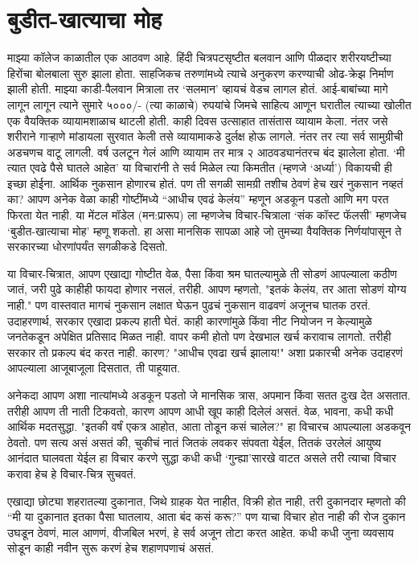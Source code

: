 \chapter{बुडीत-खात्याचा मोह}

माझ्या कॉलेज काळातील एक आठवण आहे. हिंदी चित्रपटसृष्टीत बलवान आणि पीळदार शरीरयष्टीच्या हिरोंचा बोलबाला सुरु झाला होता. साहजिकच तरुणांमध्ये त्याचे अनुकरण करण्याची ओढ-क्रेझ निर्माण झाली होती. माझ्या काडी-पैलवान मित्राला तर ‘सलमान’ व्हायचं वेडच लागल होतं. आई-बाबांच्या मागे लागून लागून त्याने सुमारे ५०००/- (त्या काळाचे) रुपयांचे जिमचे साहित्य आणून घरातील त्याच्या खोलीत एक वैयक्तिक व्यायामशाळाच थाटली होती. काही दिवस उत्साहात तासंतास व्यायाम केला. नंतर जसे शरीराने गाऱ्हाणे  मांडायला सुरवात केली तसे व्यायामाकडे दुर्लक्ष होऊ लागले. नंतर तर त्या सर्व सामुग्रीची अडचणच वाटू लागली. वर्ष उलटून गेलं आणि व्यायाम तर मात्र २ आठवड्यानंतरच बंद झालेला होता. ‘मी त्यात एवढे पैसे घातले आहेत’ या विचारांनी ते सर्व मिळेल त्या किमतीत (म्हणजे ‘अर्ध्या’) विकायची ही इच्छा होईना. आर्थिक नुकसान होणारच होतं. पण ती सगळी सामग्री तशीच ठेवणं हेच खरं नुकसान नव्हतं का? आपण अनेक वेळा काही गोष्टींमध्ये “आधीच एवढं केलंय” म्हणून अडकून पडतो आणि मग परत फिरता येत नाही. या मेंटल मॉडेल (मन:प्रारूप) ला म्हणजेच विचार-चित्राला ‘संक कॉस्ट फॅलसी’ म्हणजेच ‘बुडीत-खात्याचा मोह’ म्हणू शकतो. हा असा मानसिक सापळा आहे जो तुमच्या वैयक्तिक निर्णयांपासून ते सरकारच्या धोरणांपर्यंत सगळीकडे दिसतो.

या विचार-चित्रात, आपण एखाद्या गोष्टीत वेळ, पैसा किंवा श्रम घातल्यामुळे ती सोडणं आपल्याला कठीण जातं, जरी पुढे काहीही फायदा होणार नसलं, तरीही. आपण म्हणतो, "इतकं केलंय, तर आता सोडणं योग्य नाही." पण वास्तवात मागचं नुकसान लक्षात घेऊन पुढचं नुकसान वाढवणं अजूनच घातक ठरतं. उदाहरणार्थ, सरकार एखादा प्रकल्प हाती घेतं. काही कारणांमुळे किंवा नीट नियोजन न केल्यामुळे जनतेकडून अपेक्षित प्रतिसाद मिळत नाही. वापर कमी होतो पण देखभाल खर्च करावाच लागतो. तरीही सरकार तो प्रकल्प बंद करत नाही. कारण? "आधीच एवढा खर्च झालाय!" अशा प्रकारची अनेक उदाहरणं आपल्याला आजूबाजूला दिसतात, ती पाहूयात.

अनेकदा आपण अशा नात्यांमध्ये अडकून पडतो जे मानसिक त्रास, अपमान किंवा सतत दुःख देत असतात. तरीही आपण ती नाती टिकवतो, कारण आपण आधी खूप काही दिलेलं असतं. वेळ, भावना, कधी कधी आर्थिक मदतसुद्धा. "इतकी वर्षं एकत्र आहोत, आता तोडून कसं चालेल?" हा विचारच आपल्याला अडकवून ठेवतो. पण सत्य असं असतं की, चुकीचं नातं जितकं लवकर संपवता येईल, तितकं उरलेलं आयुष्य आनंदात घालवता येईल हा विचार करणे सुद्धा कधी कधी ‘गुन्ह्या’सारखे वाटत असले तरी त्याचा विचार करावा हेच हे विचार-चित्र सुचवतं. 

एखाद्या छोट्या शहरातल्या दुकानात, जिथे ग्राहक येत नाहीत, विक्री होत नाही, तरी दुकानदार म्हणतो की “मी या दुकानात इतका पैसा घातलाय, आता बंद कसं करू?” पण याचा विचार होत नाही की रोज दुकान उघडून ठेवणं, माल आणणं, वीजबिल भरणं, हे सर्व अजून तोटा करत आहेत. कधी कधी जुना व्यवसाय सोडून काही नवीन सुरू करणं हेच शहाणपणाचं असतं.

